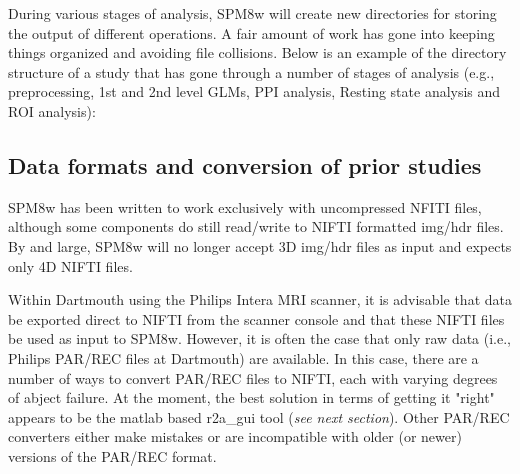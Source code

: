 \documentclass[12pt]{article}
\begin{document}
During various stages of analysis, SPM8w will create new directories for storing the output of different operations. A fair amount of work has gone into keeping things organized and avoiding file collisions. Below is an example of the directory structure of a study that has gone through a number of stages of analysis (e.g., preprocessing, 1st and 2nd level GLMs, PPI analysis, Resting state analysis and ROI analysis):
\vspace{\baselineskip}

\subsection{Data formats and conversion of prior studies}
SPM8w has been written to work exclusively with uncompressed NFITI files, although some components do still read/write to NIFTI formatted img/hdr files. By and large, SPM8w will no longer accept 3D img/hdr files as input and expects only 4D NIFTI files. 

Within Dartmouth using the Philips Intera MRI scanner, it is advisable that data be exported direct to NIFTI from the scanner console and that these NIFTI files be used as input to SPM8w. However, it is often the case that only raw data (i.e., Philips PAR/REC files at Dartmouth) are available. In this case, there are a number of ways to convert PAR/REC files to NIFTI, each with varying degrees of abject failure. At the moment, the best solution in terms of getting it "right" appears to be the matlab based r2a\_gui tool (\emph{see next section}). Other PAR/REC converters either make mistakes or are incompatible with older (or newer) versions of the PAR/REC format. 
\end{document}
